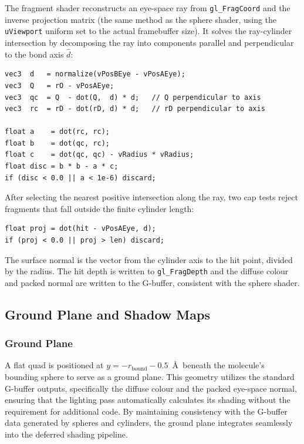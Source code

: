\documentclass[12pt, a4paper]{article}
\begin{document}
The fragment shader reconstructs an eye-space ray from \texttt{gl\_FragCoord} and the inverse projection matrix (the same method as the sphere shader, using the \texttt{uViewport} uniform set to the actual framebuffer size). It solves the ray-cylinder intersection by decomposing the ray into components parallel and perpendicular to the bond axis $\hat{d}$:
\begin{lstlisting}[style=glslstyle, caption={Axis-decomposed ray-cylinder intersection (cylinder.frag)}]
vec3  d   = normalize(vPosBEye - vPosAEye);
vec3  Q   = rO - vPosAEye;
vec3  qc  = Q  - dot(Q,  d) * d;   // Q perpendicular to axis
vec3  rc  = rD - dot(rD, d) * d;   // rD perpendicular to axis

float a    = dot(rc, rc);
float b    = dot(qc, rc);
float c    = dot(qc, qc) - vRadius * vRadius;
float disc = b * b - a * c;
if (disc < 0.0 || a < 1e-6) discard;
\end{lstlisting}

After selecting the nearest positive intersection along the ray, two cap tests reject fragments that fall outside the finite cylinder length:

\begin{lstlisting}[style=glslstyle]
float proj = dot(hit - vPosAEye, d);
if (proj < 0.0 || proj > len) discard;
\end{lstlisting}

The surface normal is the vector from the cylinder axis to the hit point, divided by the radius. The hit depth is written to \texttt{gl\_FragDepth} and the diffuse colour and packed normal are written to the G-buffer, consistent with the sphere shader.

\subsection{Ground Plane and Shadow Maps}

\subsubsection{Ground Plane}

A flat quad is positioned at $y = -r_{\text{bound}} - 0.5$~\AA\ beneath the molecule's bounding sphere to serve as a ground plane. This geometry utilizes the standard G-buffer outputs, specifically the diffuse colour and the packed eye-space normal, ensuring that the lighting pass automatically calculates its shading without the requirement for additional code. By maintaining consistency with the G-buffer data generated by spheres and cylinders, the ground plane integrates seamlessly into the deferred shading pipeline.
\end{document}
